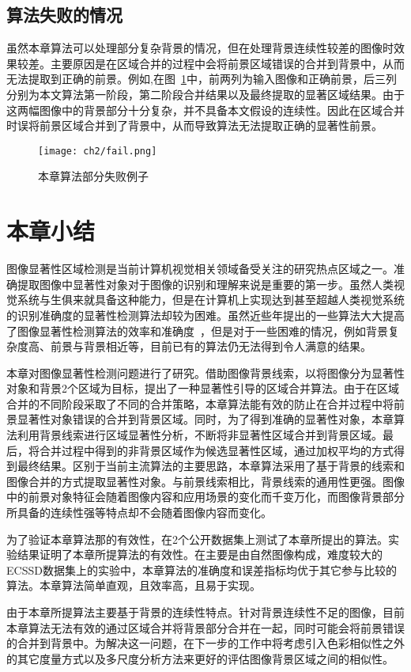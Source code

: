 \subsection{算法失败的情况}
\label{subsec:failure}

虽然本章算法可以处理部分复杂背景的情况，但在处理背景连续性较差的图像时效果较差。主要原因是在区域合并的过程中会将前景区域错误的合并到背景中，从而无法提取到正确的前景。例如,在图~\ref{fig:fail}中，前两列为输入图像和正确前景，后三列分别为本文算法第一阶段，第二阶段合并结果以及最终提取的显著区域结果。由于这两幅图像中的背景部分十分复杂，并不具备本文假设的连续性。因此在区域合并时误将前景区域合并到了背景中，从而导致算法无法提取正确的显著性前景。
 \begin{figure}[htb]
  \centering%
      {\texttt{[image: ch2/fail.png]}}

  \caption{本章算法部分失败例子}
  \label{fig:fail}
\end{figure}


\section{本章小结}
图像显著性区域检测是当前计算机视觉相关领域备受关注的研究热点区域之一。准确提取图像中显著性对象对于图像的识别和理解来说是重要的第一步。虽然人类视觉系统与生俱来就具备这种能力，但是在计算机上实现达到甚至超越人类视觉系统的识别准确度的显著性检测算法却较为困难。虽然近些年提出的一些算法大大提高了图像显著性检测算法的效率和准确度~\cite{ChengPAMI,ufo,Yan2014Hierarchical,geodesicDistance}，但是对于一些困难的情况，例如背景复杂度高、前景与背景相近等，目前已有的算法仍无法得到令人满意的结果。\par
本章对图像显著性检测问题进行了研究。借助图像背景线索，以将图像分为显著性对象和背景2个区域为目标，提出了一种显著性引导的区域合并算法。由于在区域合并的不同阶段采取了不同的合并策略，本章算法能有效的防止在合并过程中将前景显著性对象错误的合并到背景区域。同时，为了得到准确的显著性对象，本章算法利用背景线索进行区域显著性分析，不断将非显著性区域合并到背景区域。最后，将合并过程中得到的非背景区域作为候选显著性区域，通过加权平均的方式得到最终结果。区别于当前主流算法的主要思路，本章算法采用了基于背景的线索和图像合并的方式提取显著性对象。与前景线索相比，背景线索的通用性更强。图像中的前景对象特征会随着图像内容和应用场景的变化而千变万化，而图像背景部分所具备的连续性强等特点却不会随着图像内容而变化。\par
为了验证本章算法那的有效性，在2个公开数据集上测试了本章所提出的算法。实验结果证明了本章所提算法的有效性。在主要是由自然图像构成，难度较大的ECSSD数据集上的实验中，本章算法的准确度和误差指标均优于其它参与比较的算法。本章算法简单直观，且效率高，且易于实现。\par
由于本章所提算法主要基于背景的连续性特点。针对背景连续性不足的图像，目前本章算法无法有效的通过区域合并将背景部分合并在一起，同时可能会将前景错误的合并到背景中。为解决这一问题，在下一步的工作中将考虑引入色彩相似性之外的其它度量方式以及多尺度分析方法来更好的评估图像背景区域之间的相似性。
